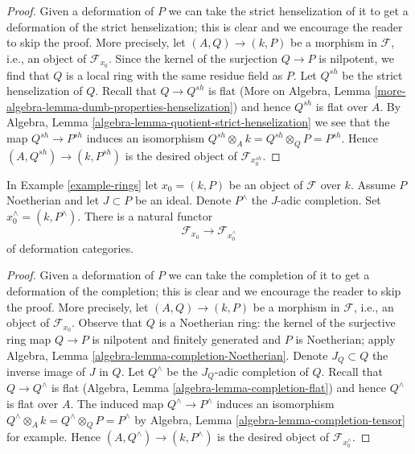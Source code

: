 \begin{proof}
Given a deformation of $P$ we can take the strict henselization
of it to get a deformation of the strict henselization; this is
clear and we encourage the reader to skip the proof. More precisely,
let $(A, Q) \to (k, P)$ be a morphism in $\mathcal{F}$, i.e.,
an object of $\mathcal{F}_{x_0}$. Since the kernel of the surjection
$Q \to P$ is nilpotent, we find that $Q$ is a local ring with the
same residue field as $P$. Let $Q^{sh}$ be the strict henselization
of $Q$. Recall that $Q \to Q^{sh}$ is flat
(More on Algebra, Lemma \ref{more-algebra-lemma-dumb-properties-henselization})
and hence $Q^{sh}$ is flat over $A$.
By Algebra, Lemma \ref{algebra-lemma-quotient-strict-henselization}
we see that the map $Q^{sh} \to P^{sh}$ induces an isomorphism
$Q^{sh} \otimes_A k = Q^{sh} \otimes_Q P = P^{sh}$.
Hence $(A, Q^{sh}) \to (k, P^{sh})$ is the desired object of
$\mathcal{F}_{x_0^{sh}}$.
\end{proof}

\begin{lemma}
\label{lemma-completion}
In Example \ref{example-rings} let $x_0 = (k, P)$ be an object
of $\mathcal{F}$ over $k$. Assume $P$ Noetherian and let
$J \subset P$ be an ideal. Denote $P^\wedge$ the $J$-adic completion.
Set $x_0^\wedge = (k, P^\wedge)$. There is a natural functor
$$
\mathcal{F}_{x_0} \longrightarrow \mathcal{F}_{x_0^\wedge}
$$
of deformation categories.
\end{lemma}

\begin{proof}
Given a deformation of $P$ we can take the completion
of it to get a deformation of the completion; this is
clear and we encourage the reader to skip the proof. More precisely,
let $(A, Q) \to (k, P)$ be a morphism in $\mathcal{F}$, i.e.,
an object of $\mathcal{F}_{x_0}$. Observe that $Q$ is a Noetherian
ring: the kernel of the surjective ring map $Q \to P$ is
nilpotent and finitely generated and $P$ is Noetherian; apply
Algebra, Lemma \ref{algebra-lemma-completion-Noetherian}.
Denote $J_Q \subset Q$ the inverse
image of $J$ in $Q$. Let $Q^\wedge$ be the $J_Q$-adic completion of $Q$.
Recall that $Q \to Q^\wedge$ is flat
(Algebra, Lemma \ref{algebra-lemma-completion-flat})
and hence $Q^\wedge$ is flat over $A$.
The induced map $Q^\wedge \to P^\wedge$ induces an isomorphism
$Q^\wedge \otimes_A k = Q^\wedge \otimes_Q P = P^\wedge$ by
Algebra, Lemma \ref{algebra-lemma-completion-tensor} for example.
Hence $(A, Q^\wedge) \to (k, P^\wedge)$
is the desired object of $\mathcal{F}_{x_0^\wedge}$.
\end{proof}



